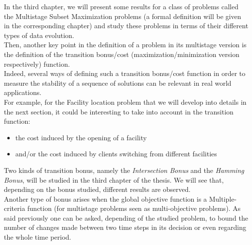 \documentclass[a4paper]{book}
\begin{document}
In the third chapter, we will present some results for a class of problems called the {\sc Multistage Subset Maximization} problems (a formal definition will be given in the corresponding chapter) and study these problems in terms of their different types of data evolution. \\

Then, another key point in the definition of a problem in its multistage version is the definition of the transition bonus/cost (maximization/minimization version respectively) function.\\
Indeed, several ways of defining such a transition bonus/cost function in order to measure the stability of a sequence of solutions can be relevant in real world applications. \\
For example, for the {\sc Facility location} problem that we will develop into details in the next section, it could be interesting to take into account in the transition function:
\begin{itemize}
    \item the cost induced by the opening of a facility
    \item and/or the cost induced by clients switching from different facilities
\end{itemize} 
Two kinds of transition bonus, namely the \emph{Intersection Bonus} and the \emph{Hamming Bonus}, will be studied in the third chapter of the thesis. We will see that, depending on the bonus studied, different results are observed.\\
Another type of bonus arises when the global objective function is a Multiple-criteria function (for multistage problems seen as multi-objective problems). As said previously one can be asked, depending of the studied problem, to bound the number of changes made between two time steps in its decision or even regarding the whole time period.\\
\end{document}
